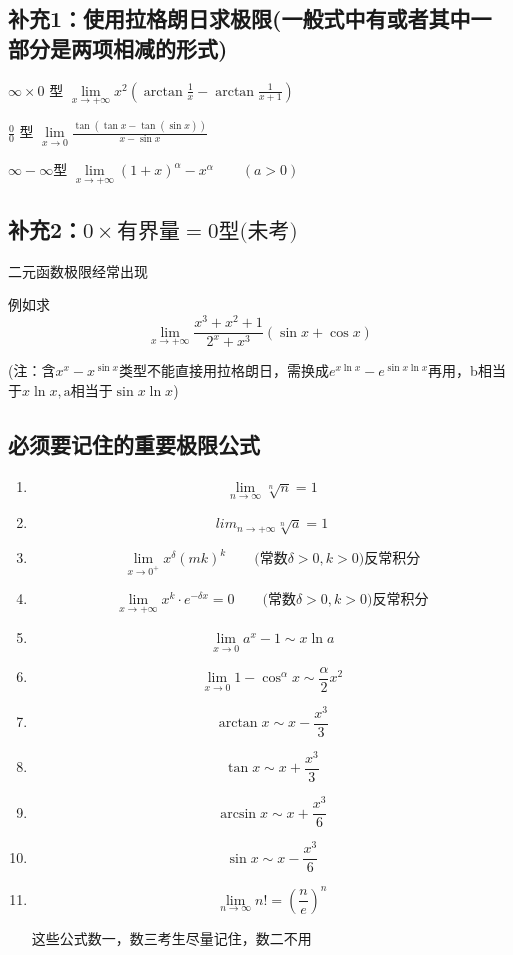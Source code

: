 \documentclass[a4paper,11pt]{book}
\begin{document}
\subsection*{补充1：使用拉格朗日求极限(一般式中有或者其中一部分是两项相减的形式)}

$\infty \times 0$ 型  \quad $\lim\limits _{x\rightarrow + \infty}x^{2}\left(\arctan \frac{1}{x} - \arctan \frac{1}{x+1}\right)$

\vspace{2ex}

\noindent $\frac{0}{0}$ 型  \qquad $\lim\limits _{x \rightarrow 0}\frac{\tan(\tan x-\tan(\sin x))}{x-\sin x}$

\vspace{2ex}

\noindent $\infty -\infty $型 \quad $\lim \limits_{x \rightarrow +\infty}(1+x)^{\alpha}-x^{\alpha}\qquad (a > 0)$


\subsection*{补充2：$0\times \text{有界量}=0\text{型(未考)}$}
二元函数极限经常出现

\vspace{2ex}

例如求\[\lim_{x\rightarrow + \infty }\frac{x^{3}+x^{2}+1}{2^{x}+x^{3}}\left(\sin x +\cos x\right)\]

(注：含$x^{x}-x^{\sin x}$类型不能直接用拉格朗日，需换成$e^{x\ln x}-e^{\sin x \ln x}$再用，b相当于$x\ln x,\text{a相当于}\sin x \ln x$)

\subsection*{必须要记住的重要极限公式}

\begin{enumerate}
\item \[\lim _{n \rightarrow \infty} \sqrt[n]{n}=1\]
\item \[lim _{n \rightarrow + \infty} \sqrt[n]{a}=1\]
\item \[\lim_{x\rightarrow 0^{+}}x^{\delta } \left(mk\right)^{k}\qquad \text{(常数}\delta>0,k>0\text{)反常积分}\]
\item  \[\lim_{x \rightarrow +\infty}x^{k}·e^{-\delta x}=0\qquad \text{(常数}\delta>0,k>0\text{)反常积分}\]
\item  \[\lim _{x \rightarrow 0}a^{x}-1 \sim x \ln a\]
\item  \[\lim _{x \rightarrow 0}1-\cos^{\alpha}x \sim \frac{\alpha}{2}x^{2}\]
\item \[\arctan x \sim x - \frac{x^{3}}{3}\]
\item \[\tan x \sim x + \frac{x^{3}}{3}\]
\item  \[\arcsin x \sim x + \frac{x^{3}}{6}\]
\item  \[\sin x \sim x -\frac{x^{3}}{6}\]
\item   \[\lim _{n\rightarrow \infty}n!=\left(\frac{n}{e}\right)^{n}\]
\begin{center}
     这些公式数一，数三考生尽量记住，数二不用
\end{center}
\end{enumerate}
\end{document}
